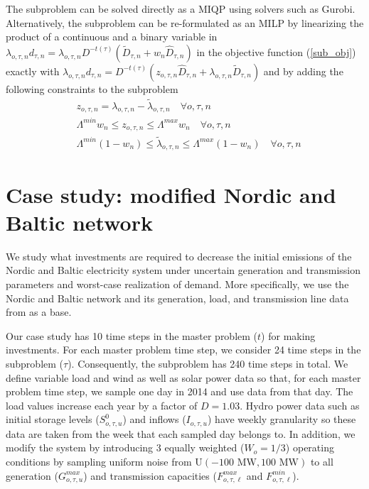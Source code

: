 \documentclass[final]{IEEEtran}
\begin{document}
The subproblem can be solved directly as a MIQP using solvers such as Gurobi. Alternatively, the subproblem can be re-formulated as an MILP by linearizing the product of a continuous and a binary variable in $\lambda_{o, \tau, n} d_{\tau, n} = \lambda_{o, \tau, n} D^{-t(\tau)} (\tilde{D}_{\tau, n} + w_n \hat{D}_{\tau, n})$ in the objective function (\ref{sub_obj}) exactly with $\lambda_{o, \tau, n} d_{\tau, n} = D^{-t(\tau)} (z_{o, \tau, n} \hat{D}_{\tau, n} + \lambda_{o, \tau, n} \tilde{D}_{\tau, n})$ and by adding the following constraints to the subproblem
\begin{align}
&\label{z_constr} z_{o, \tau, n} = \lambda_{o, \tau, n} - \tilde{\lambda}_{o, \tau, n} \quad \forall o, \tau, n \\
&\Lambda^{min} w_n \leq z_{o, \tau, n} \leq \Lambda^{max} w_n \quad \forall o, \tau, n \\
&\Lambda^{min} (1 - w_n) \leq \tilde{\lambda}_{o, \tau, n} \leq \Lambda^{max} (1 - w_n) \quad \forall o, \tau, n
\end{align}

\section{Case study: modified Nordic and Baltic network}
\label{section_case_study}

We study what investments are required to decrease the initial emissions of the Nordic and Baltic electricity system under uncertain generation and transmission parameters and worst-case realization of demand. More specifically, we use the Nordic and Baltic network and its generation, load, and transmission line data from \cite{Virasjoki} as a base.

Our case study has 10 time steps in the master problem ($t$) for making investments. For each master problem time step, we consider 24 time steps in the subproblem ($\tau$). Consequently, the subproblem has 240 time steps in total. We define variable load and wind as well as solar power data so that, for each master problem time step, we sample one day in 2014 and use data from that day. The load values increase each year by a factor of $D = 1.03$. Hydro power data such as initial storage levels ($S_{o, \tau, u}^0$) and inflows ($I_{o, \tau, u}$) have weekly granularity so these data are taken from the week that each sampled day belongs to. In addition, we modify the system by introducing 3 equally weighted ($W_o = 1/3$) operating conditions by sampling uniform noise from $\textrm{U}(-100 \textrm{ MW}, 100 \textrm{ MW})$ to all generation ($G^{max}_{o, \tau, u}$) and transmission capacities ($F^{max}_{o, \tau, \ell}$ and $F^{min}_{o, \tau, \ell}$).
\end{document}
